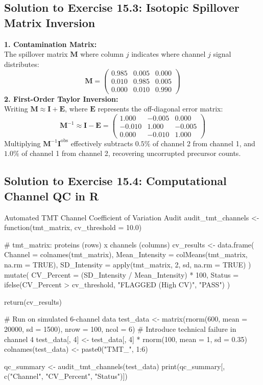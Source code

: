 \documentclass[11pt,oneside]{book}
\begin{document}
\subsection*{Solution to Exercise 15.3: Isotopic Spillover Matrix Inversion}
\textbf{1. Contamination Matrix:}\\
The spillover matrix $\mathbf{M}$ where column $j$ indicates where channel $j$ signal distributes:
\begin{equation*}
\mathbf{M} = \begin{pmatrix}
0.985 & 0.005 & 0.000 \\
0.010 & 0.985 & 0.005 \\
0.000 & 0.010 & 0.990
\end{pmatrix}
\end{equation*}
\textbf{2. First-Order Taylor Inversion:}\\
Writing $\mathbf{M} \approx \mathbf{I} + \mathbf{E}$, where $\mathbf{E}$ represents the off-diagonal error matrix:
$$\mathbf{M}^{-1} \approx \mathbf{I} - \mathbf{E} = \begin{pmatrix}
1.000 & -0.005 & 0.000 \\
-0.010 & 1.000 & -0.005 \\
0.000 & -0.010 & 1.000
\end{pmatrix}$$
Multiplying $\mathbf{M}^{-1} \mathbf{I}^{\text{obs}}$ effectively subtracts $0.5\%$ of channel 2 from channel 1, and $1.0\%$ of channel 1 from channel 2, recovering uncorrupted precursor counts.

\subsection*{Solution to Exercise 15.4: Computational Channel QC in R}
\begin{rchunk}{Automated TMT Channel Coefficient of Variation Audit}
audit_tmt_channels <- function(tmt_matrix, cv_threshold = 10.0) {
  # tmt_matrix: proteins (rows) x channels (columns)
  cv_results <- data.frame(
    Channel = colnames(tmt_matrix),
    Mean_Intensity = colMeans(tmt_matrix, na.rm = TRUE),
    SD_Intensity   = apply(tmt_matrix, 2, sd, na.rm = TRUE)
  ) %
    mutate(
      CV_Percent = (SD_Intensity / Mean_Intensity) * 100,
      Status     = ifelse(CV_Percent > cv_threshold, "FLAGGED (High CV)", "PASS")
    )
  
  return(cv_results)
}

# Run on simulated 6-channel data
test_data <- matrix(rnorm(600, mean = 20000, sd = 1500), nrow = 100, ncol = 6)
# Introduce technical failure in channel 4
test_data[, 4] <- test_data[, 4] * rnorm(100, mean = 1, sd = 0.35)
colnames(test_data) <- paste0("TMT_", 1:6)

qc_summary <- audit_tmt_channels(test_data)
print(qc_summary[, c("Channel", "CV_Percent", "Status")])
\end{rchunk}
\end{document}

